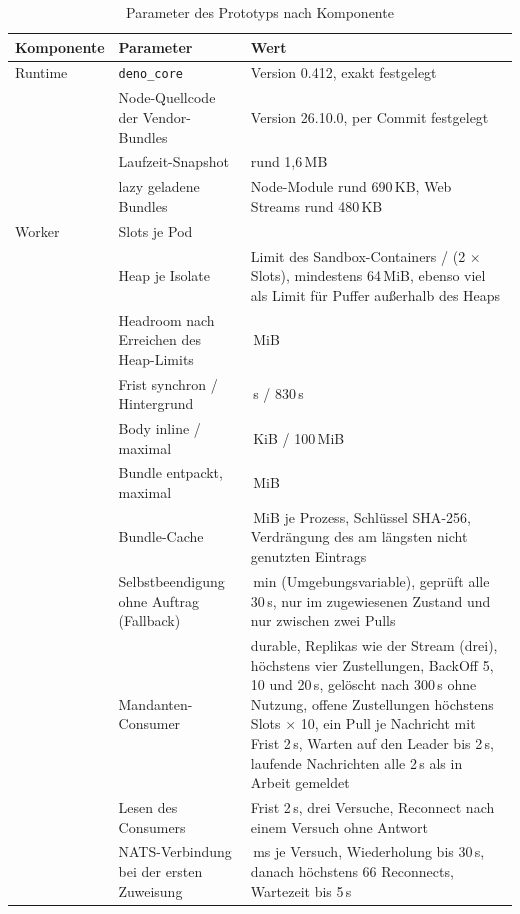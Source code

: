 \begin{table}[H]
  \caption{Parameter des Prototyps nach Komponente}
  \label{tab:parameter}
  \scriptsize
  \renewcommand{\arraystretch}{1.0}
  \begin{tabularx}{\textwidth}{@{}>{\RaggedRight\arraybackslash}p{}
    >{\RaggedRight\arraybackslash}p{} >{\RaggedRight\arraybackslash}X@{}}
    \hline
    Komponente & Parameter & Wert \\
    \hline
    Runtime & \texttt{deno\_core} & Version 0.412, exakt festgelegt \\
    & Node-Quellcode der Vendor-Bundles & Version 26.10.0, per Commit festgelegt \\
    & Laufzeit-Snapshot & rund 1,6\,MB \\
    & lazy geladene Bundles & Node-Module rund 690\,KB, Web Streams rund 480\,KB \\[2pt]
    Worker & Slots je Pod & 4 \\
    & Heap je Isolate & Limit des Sandbox-Containers / (2 $\times$ Slots), mindestens 64\,MiB, ebenso viel als Limit für Puffer außerhalb des Heaps \\
    & Headroom nach Erreichen des Heap-Limits & 32\,MiB \\
    & Frist synchron / Hintergrund & 50\,s / 830\,s \\
    & Body inline / maximal & 64\,KiB / 100\,MiB \\
    & Bundle entpackt, maximal & 64\,MiB \\
    & Bundle-Cache & 128\,MiB je Prozess, Schlüssel \acs{SHA}-256, Verdrängung des am
      längsten nicht genutzten Eintrags \\
    & Selbstbeendigung ohne Auftrag (Fallback) & 5\,min (Umgebungsvariable), geprüft alle 30\,s, nur im
      zugewiesenen Zustand und nur zwischen zwei Pulls \\
    & Mandanten-Consumer & durable, Replikas wie der Stream (drei), höchstens vier Zustellungen, BackOff 5, 10 und
      20\,s, gelöscht nach 300\,s ohne Nutzung, offene Zustellungen höchstens Slots $\times$ 10,
      ein Pull je Nachricht mit Frist 2\,s, Warten auf den Leader bis 2\,s, laufende Nachrichten alle 2\,s als in Arbeit
      gemeldet \\
    & Lesen des Consumers & Frist 2\,s, drei Versuche, Reconnect nach einem Versuch ohne Antwort \\
    & NATS-Verbindung bei der ersten Zuweisung & 500\,ms je Versuch, Wiederholung bis 30\,s, danach höchstens 66
      Reconnects, Wartezeit bis 5\,s \\

\end{tabularx}
\end{table}
